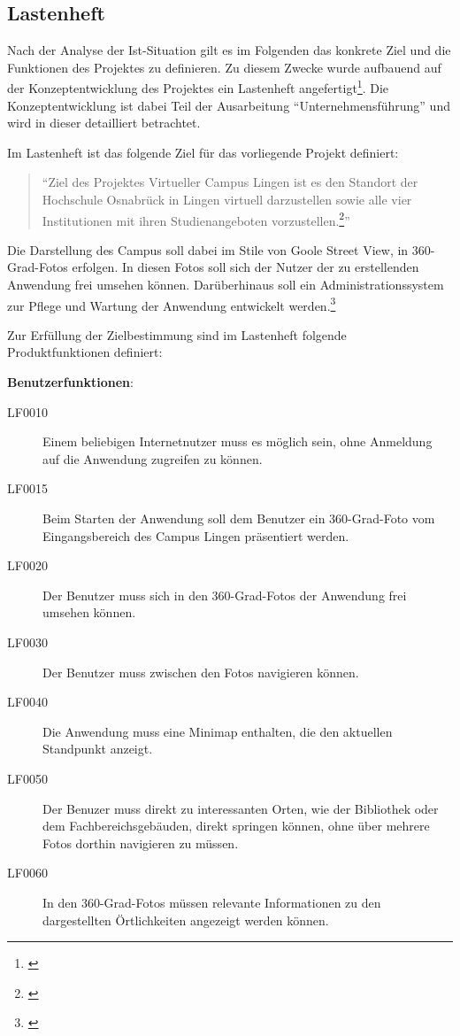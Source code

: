 \subsection{Lastenheft}
\label{sec:Lastenheft}

Nach der Analyse der Ist-Situation gilt es im Folgenden das konkrete Ziel und
die Funktionen des Projektes zu definieren. Zu diesem Zwecke wurde aufbauend auf
der Konzeptentwicklung des Projektes ein Lastenheft
angefertigt\footnote{\citet{lastenheft2013}}. Die Konzeptentwicklung ist
dabei Teil der Ausarbeitung "`Unternehmensführung"' und wird in dieser
detailliert betrachtet.

Im Lastenheft ist das folgende Ziel für das vorliegende Projekt definiert:

\begin{quote}
"`Ziel des Projektes Virtueller Campus Lingen ist es den Standort der Hochschule Osnabrück
in Lingen virtuell darzustellen sowie alle vier Institutionen mit ihren Studienangeboten
vorzustellen.\footnote{\citet[S.~1]{lastenheft2013}}"'
\end{quote}

Die Darstellung des Campus soll dabei im Stile von Goole Street View, in
360-Grad-Fotos erfolgen. In diesen Fotos soll sich der Nutzer der zu
erstellenden Anwendung frei umsehen können. Darüberhinaus soll ein
Administrationssystem zur Pflege und Wartung der Anwendung entwickelt
werden.\footnote{\citet[S.~1]{lastenheft2013}}

Zur Erfüllung der Zielbestimmung sind im Lastenheft folgende Produktfunktionen
definiert:

\textbf{Benutzerfunktionen}:

\begin{description}
  \item[LF0010] Einem beliebigen Internetnutzer muss es möglich sein, ohne
  Anmeldung auf die Anwendung zugreifen zu können.
  \item[LF0015] Beim Starten der Anwendung soll dem Benutzer ein 360-Grad-Foto
  vom Eingangsbereich des Campus Lingen präsentiert werden.
  \item[LF0020] Der Benutzer muss sich in den 360-Grad-Fotos der Anwendung frei
  umsehen können.
  \item[LF0030] Der Benutzer muss zwischen den Fotos navigieren können.
  \item[LF0040] Die Anwendung muss eine Minimap enthalten, die den
  aktuellen Standpunkt anzeigt.
  \item[LF0050] Der Benuzer muss direkt zu interessanten Orten, wie der
  Bibliothek oder dem Fachbereichsgebäuden, direkt springen können, ohne
  über mehrere Fotos dorthin navigieren zu müssen.
  \item[LF0060] In den 360-Grad-Fotos müssen relevante Informationen zu den
  dargestellten Ört\-lich\-kei\-ten angezeigt werden können.
\end{description}

